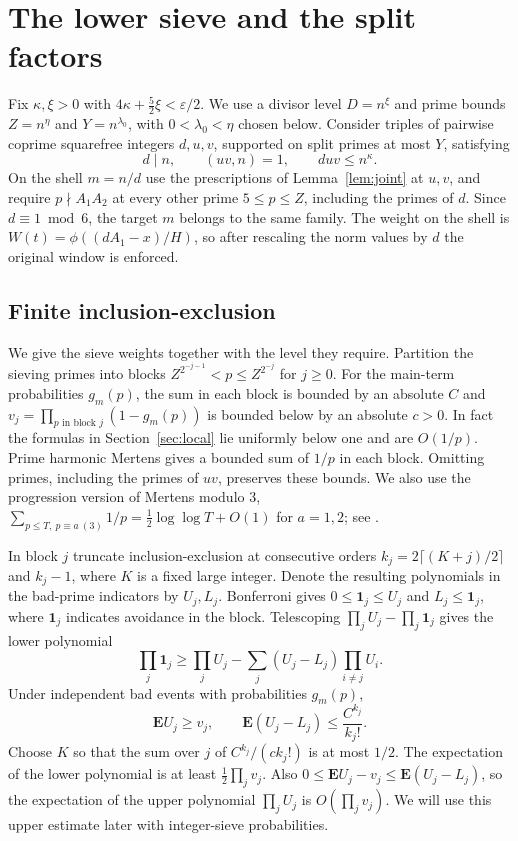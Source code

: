 \section{The lower sieve and the split factors}\label{sec:sieve}
Fix \(\kappa,\xi>0\) with \(4\kappa+\frac52\xi<\varepsilon/2\).
We use a divisor level \(D=n^\xi\) and prime bounds \(Z=n^\eta\)
and \(Y=n^{\lambda_0}\), with \(0<\lambda_0<\eta\) chosen below.
Consider triples of pairwise coprime squarefree integers \(d,u,v\),
supported on split primes at most \(Y\), satisfying
\begin{equation}\label{eq:triples}
 d\mid n,\qquad (uv,n)=1,\qquad duv\le n^\kappa .
\end{equation}
On the shell \(m=n/d\) use the prescriptions of Lemma~\ref{lem:joint}
at \(u,v\), and require \(p\nmid A_1A_2\) at every other prime
\(5\le p\le Z\), including the primes of \(d\).
Since \(d\equiv1\bmod6\), the target \(m\) belongs to the same
family. The weight on the shell is
\(W(t)=\phi((dA_1-x)/H)\), so after rescaling the norm values by
\(d\) the original window is enforced.

\subsection{Finite inclusion-exclusion}
We give the sieve weights together with the level they require.
Partition the sieving primes into blocks
\(Z^{2^{-j-1}}<p\le Z^{2^{-j}}\) for \(j\ge0\).
For the main-term probabilities \(g_m(p)\), the sum in each block
is bounded by an absolute \(C\) and
\(v_j=\prod_{p\text{ in block }j}(1-g_m(p))\) is bounded below
by an absolute \(c>0\). In fact the formulas in
Section~\ref{sec:local} lie uniformly below one and are \(O(1/p)\).
Prime harmonic Mertens gives a bounded sum of \(1/p\) in each block.
Omitting primes, including the primes of \(uv\), preserves these
bounds. We also use the progression version of Mertens modulo \(3\),
\(\sum_{p\le T,\ p\equiv a\ (3)}1/p=\tfrac12\log\log T+O(1)\)
for \(a=1,2\); see \cite[Lemma~2.4]{LM}.

In block \(j\) truncate inclusion-exclusion at consecutive orders
\(k_j=2\lceil(K+j)/2\rceil\) and \(k_j-1\), where \(K\) is a fixed
large integer. Denote the resulting polynomials in the bad-prime
indicators by \(U_j,L_j\). Bonferroni gives
\(0\le\mathbf1_j\le U_j\) and \(L_j\le\mathbf1_j\), where
\(\mathbf1_j\) indicates avoidance in the block. Telescoping
\(\prod_j U_j-\prod_j\mathbf1_j\) gives the lower polynomial
\begin{equation}\label{eq:lower-poly}
 \prod_j\mathbf1_j\ge
 \prod_j U_j-\sum_j(U_j-L_j)\prod_{i\ne j}U_i .
\end{equation}
Under independent bad events with probabilities \(g_m(p)\),
\[
 \mathbf E U_j\ge v_j,\qquad
 \mathbf E(U_j-L_j)\le \frac{C^{k_j}}{k_j!}.
\]
Choose \(K\) so that the sum over \(j\) of \(C^{k_j}/(c k_j!)\)
is at most \(1/2\). The expectation of the lower polynomial is
at least \(\frac12\prod_j v_j\). Also
\(0\le \mathbf E U_j-v_j\le\mathbf E(U_j-L_j)\), so the expectation
of the upper polynomial \(\prod_j U_j\) is \(O(\prod_j v_j)\).
We will use this upper estimate later with integer-sieve
probabilities.

